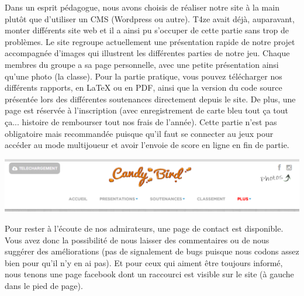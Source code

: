 \documentclass [11pt]{report}
\begin{document}
	Dans un esprit pédagogue, nous avons choisis de réaliser notre site à la main plutôt que d'utiliser un CMS (Wordpress ou autre). T4ze avait déjà, auparavant, monter différents site web et il a ainsi pu s'occuper de cette partie sans trop de problèmes. Le site regroupe actuellement une présentation rapide de notre projet accompagnée d'images qui illustrent les différentes parties de notre jeu. Chaque membres du groupe a sa page personnelle, avec une petite présentation ainsi qu'une photo (la classe). Pour la partie pratique, vous pouvez télécharger nos différents rapports, en LaTeX ou en PDF, ainsi que la version du code source présentée lors des différentes soutenances directement depuis le site. De plus, une page est réservée à l'inscription (avec enregistrement de carte bleu tout ça tout ça... histoire de rembourser tout nos frais de l'année). Cette partie n'est pas obligatoire mais recommandée puisque qu'il faut se connecter au jeux pour accéder au mode multijoueur et avoir l'envoie de score en ligne en fin de partie.\\
	\vspace{4mm}
	\begin{center}
	\includegraphics[scale=0.5]{images/site.png}
	\end{center}
	
	\vspace{10mm}
	
	Pour rester à l'écoute de nos admirateurs, une page de contact est disponible. Vous avez donc la possibilité de nous laisser des commentaires ou de nous suggérer des améliorations (pas de signalement de bugs puisque nous codons assez bien pour qu'il n'y en ai pas). Et pour ceux qui aiment être toujours informé, nous tenons une page facebook dont un raccourci est visible sur le site (à gauche dans le pied de page).
	
	\vspace{10mm}
	
\end{document}

